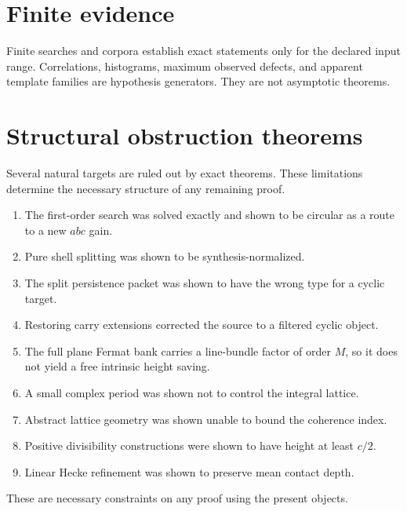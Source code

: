 \section{Finite evidence}
Finite searches and corpora establish exact statements only for the declared input range. Correlations, histograms, maximum observed defects, and apparent template families are hypothesis generators. They are not asymptotic theorems.

\section{Structural obstruction theorems}
Several natural targets are ruled out by exact theorems. These limitations determine the necessary structure of any remaining proof.

\begin{enumerate}[leftmargin=1.5em]
\item The first-order search was solved exactly and shown to be circular as a route to a new $abc$ gain.
\item Pure shell splitting was shown to be synthesis-normalized.
\item The split persistence packet was shown to have the wrong type for a cyclic target.
\item Restoring carry extensions corrected the source to a filtered cyclic object.
\item The full plane Fermat bank carries a line-bundle factor of order $M$, so it does not yield a free intrinsic height saving.
\item A small complex period was shown not to control the integral lattice.
\item Abstract lattice geometry was shown unable to bound the coherence index.
\item Positive divisibility constructions were shown to have height at least $c/2$.
\item Linear Hecke refinement was shown to preserve mean contact depth.
\end{enumerate}

These are necessary constraints on any proof using the present objects.

